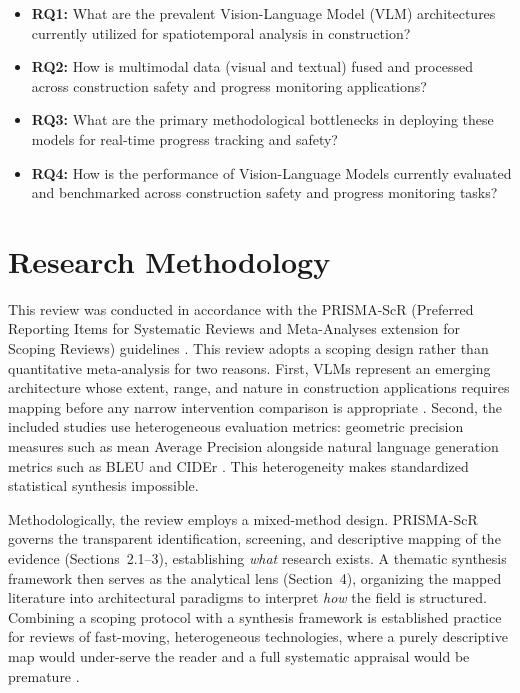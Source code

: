 \documentclass[10pt,letterpaper]{article}
\begin{document}
\begin{itemize}
  \item \textbf{RQ1:} What are the prevalent Vision-Language Model (VLM) architectures currently utilized for spatiotemporal analysis in construction?
  \item \textbf{RQ2:} How is multimodal data (visual and textual) fused and processed across construction safety and progress monitoring applications?
  \item \textbf{RQ3:} What are the primary methodological bottlenecks in deploying these models for real-time progress tracking and safety?
  \item \textbf{RQ4:} How is the performance of Vision-Language Models currently evaluated and benchmarked across construction safety and progress monitoring tasks?
\end{itemize}

\section{Research Methodology}

This review was conducted in accordance with the PRISMA-ScR (Preferred Reporting Items for Systematic Reviews and Meta-Analyses extension for Scoping Reviews) guidelines \cite{tricco2018}. This review adopts a scoping design rather than quantitative meta-analysis for two reasons. First, VLMs represent an emerging architecture whose extent, range, and nature in construction applications requires mapping before any narrow intervention comparison is appropriate \cite{chan2025,chen2024}. Second, the included studies use heterogeneous evaluation metrics: geometric precision measures such as mean Average Precision \cite{nath2020,wang2024} alongside natural language generation metrics such as BLEU and CIDEr \cite{jung2024,xiao2022}. This heterogeneity makes standardized statistical synthesis impossible.

Methodologically, the review employs a mixed-method design. PRISMA-ScR governs the transparent identification, screening, and descriptive mapping of the evidence (Sections~2.1--3), establishing \emph{what} research exists. A thematic synthesis framework then serves as the analytical lens (Section~4), organizing the mapped literature into architectural paradigms to interpret \emph{how} the field is structured. Combining a scoping protocol with a synthesis framework is established practice for reviews of fast-moving, heterogeneous technologies, where a purely descriptive map would under-serve the reader and a full systematic appraisal would be premature \cite{sherafat2020}.
\end{document}
